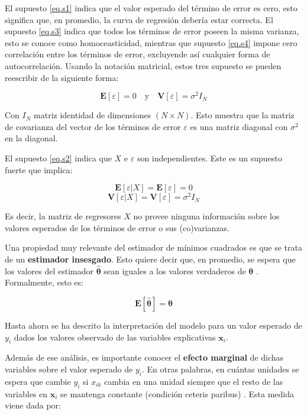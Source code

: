 El supuesto \eqref{eq.s1} indica que el valor esperado del término de error es cero, esto significa que, en promedio, la curva de regresión debería estar correcta. El supuesto \eqref{eq.s3} indica que todos los términos de error poseen la misma varianza, esto se conoce como homoceasticidad, mientras que supuesto \eqref{eq.s4} impone cero correlación entre los términos de error, excluyende así cualquier forma de autocorrelación. Usando la notación matricial, estos tres supuesto se pueden reescribir de la siguiente forma:

\begin{equation}
    \bm{E}[\varepsilon]=0\quad\text{y}\quad\bm{V}[\varepsilon]=\sigma^2I_N
\end{equation}

Con $I_N$ matriz identidad de dimensiones $(N\times N)$. Esto muestra que la matriz de covarianza del vector de los términos de error $\varepsilon$ es una matriz diagonal con $\sigma^2$ en la diagonal.

El supuesto \eqref{eq.s2} indica que $X$ e $\varepsilon$ son independientes. Este es un supuesto fuerte que implica:

\begin{equation}
    \bm{E}[\varepsilon|X]=\bm{E}[\varepsilon]=0
\end{equation}
\begin{equation}
    \bm{V}[\varepsilon|X]=\bm{V}[\varepsilon]=\sigma^2I_N
\end{equation}

Es decir, la matriz de regresores $X$ no provee ninguna información sobre los valores esperados de los términos de error o sus (co)varianzas. 

Una propiedad muy relevante del estimador de mínimos cuadrados es que se trata de un \textbf{estimador insesgado}. Esto quiere decir que, en promedio, se espera que los valores del estimador $\bm{\hat\theta}$ sean iguales a los valores verdaderos de $\bm{\theta}$ \cite{verbeek}. Formalmente, esto es:

\begin{equation}
    \bm{E}[\hat{\bm{\theta}}] = \bm{\theta}
\end{equation}

Hasta ahora se ha descrito la interpretación del modelo para un valor esperado de $y_i$ dados los valores observado de las variables explicativas $\bm{x}_i$.

Además de ese análisis, es importante conocer el \textbf{efecto marginal} de dichas variables sobre el valor esperado de $y_i$. En otras palabras, en cuántas unidades se espera que cambie $y_i$ si $x_{ik}$ cambia en una unidad siempre que el resto de las variables en $\bm{x}_i$ se mantenga constante (condición ceteris paribus) \cite{hansen2018}. Esta medida viene dada por:

